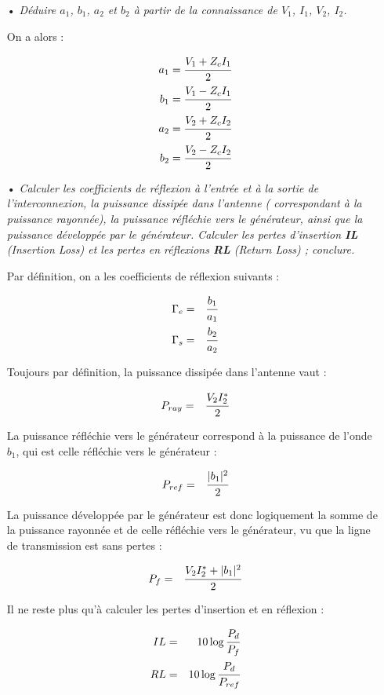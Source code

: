 \documentclass[10pt]{article}
\begin{document}
\begin{itemize}
    \item[•] \textit{Déduire $a_1$, $b_1$, $a_2$ et $b_2$ à partir de la connaissance de $V_1$, $I_1$, $V_2$, $I_2$.}

        On a alors :

        \begin{eqnarray}
            a_1 = \cfrac{ V_1 + Z_c I_1}{2} \\
            b_1 = \cfrac{ V_1 - Z_c I_1}{2} \\
            a_2 = \cfrac{ V_2 + Z_c I_2}{2} \\
            b_2 = \cfrac{ V_2 - Z_c I_2}{2}
        \end{eqnarray}

    \item[•] \textit{Calculer les coefficients de réflexion à l'entrée et à la sortie de l'interconnexion, la puissance dissipée dans l'antenne ( correspondant à la puissance rayonnée), la puissance réfléchie vers le générateur, ainsi que la puissance développée par le générateur. Calculer les pertes d'insertion \textbf{IL} (\emph{Insertion Loss}) et les pertes en réflexions \textbf{RL} (\emph{Return Loss}) ; conclure.}

        Par définition, on a les coefficients de réflexion suivants :

        \begin{eqnarray}
            \Gamma_e &=& \cfrac{b_1}{a_1} \\
            \Gamma_s &=& \cfrac{b_2}{a_2}
        \end{eqnarray}

        Toujours par définition, la puissance dissipée dans l'antenne vaut :

        \begin{eqnarray}
            P_{ray} &=& \cfrac{V_2 I_2^\ast}{2}
        \end{eqnarray}

        La puissance réfléchie vers le générateur correspond à la puissance de l'onde $b_1$, qui est celle réfléchie vers le générateur :

        \begin{eqnarray}
            P_{ref} &=& \cfrac{|b_1|^2}{2}
        \end{eqnarray}

        La puissance développée par le générateur est donc logiquement la somme de la puissance rayonnée et de celle réfléchie vers le générateur, vu que la ligne de transmission est sans pertes :

        \begin{eqnarray}
            P_f &=&  \cfrac{V_2 I_2^\ast + |b_1|^2}{2}
        \end{eqnarray}

        Il ne reste plus qu'à calculer les pertes d'insertion et en réflexion :

        \begin{eqnarray}
            IL &=& 10 \log \cfrac{P_d}{P_f} \\
            RL &=& 10 \log \cfrac{P_d}{P_{ref}}
        \end{eqnarray}

\end{itemize}
\end{document}
